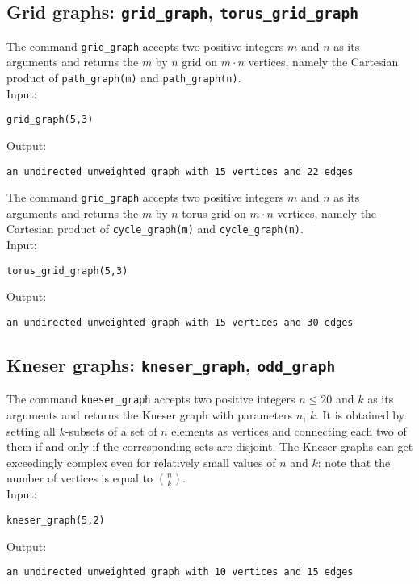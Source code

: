\documentclass[a4paper,11pt]{article}
\begin{document}
\subsection{Grid graphs: {\tt grid\_graph}, {\tt torus\_grid\_graph}}

The command {\tt grid\_graph} accepts two positive integers $ m $ and $ n $ as its arguments and returns the $ m $ by $ n $ grid on $ m\cdot n $ vertices, namely the Cartesian product of {\tt path\_graph(m)} and {\tt path\_graph(n)}.\\
Input:
\begin{center}
  \tt grid\_graph(5,3)
\end{center}
Output:
\begin{center}
  \tt an undirected unweighted graph with 15 vertices and 22 edges
\end{center}

The command {\tt grid\_graph} accepts two positive integers $ m $ and $ n $ as its arguments and returns the $ m $ by $ n $ torus grid on $ m\cdot n $ vertices, namely the Cartesian product of {\tt cycle\_graph(m)} and {\tt cycle\_graph(n)}.\\
Input:
\begin{center}
  \tt torus\_grid\_graph(5,3)
\end{center}
Output:
\begin{center}
  \tt an undirected unweighted graph with 15 vertices and 30 edges
\end{center}

\subsection{Kneser graphs: {\tt kneser\_graph}, {\tt odd\_graph}}

The command {\tt kneser\_graph} accepts two positive integers $ n\leq 20 $ and $ k $ as its arguments and returns the Kneser graph with parameters $ n $, $ k $. It is obtained by setting all $ k $-subsets of a set of $ n $ elements as vertices and connecting each two of them if and only if the corresponding sets are disjoint. The Kneser graphs can get exceedingly complex even for relatively small values of $ n $ and $ k $: note that the number of vertices is equal to $ \binom{n}{k} $.\\
Input:
\begin{center}
  \tt kneser\_graph(5,2)
\end{center}
Output:
\begin{center}
  \tt an undirected unweighted graph with 10 vertices and 15 edges
\end{center}
\end{document}
